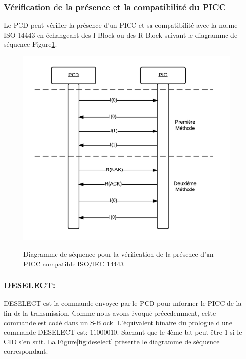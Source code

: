 \documentclass{themeensg}
\begin{document}
\subsubsection{Vérification de la présence et la compatibilité du PICC}
Le PCD peut vérifier la présence d'un PICC et sa compatibilité avec la norme ISO-14443 en échangeant des I-Block ou des R-Block suivant le diagramme de séquence Figure\ref{fig:presencecheck}.

\begin{figure}[h!]
\centering
\includegraphics[scale=0.9]{images/presencecheck.png}
\label{fig:presencecheck}
\caption{Diagramme de séquence pour la vérification de la présence d'un PICC compatible ISO/IEC 14443}
\end{figure}

\subsubsection{DESELECT:}
DESELECT est la commande envoyée par le PCD pour informer le PICC de la fin de la transmission. Comme nous avons évoqué précedemment, cette commande est codé dans un S-Block. L'équivalent binaire du prologue d'une commande DESELECT est: $11000010$. Sachant que le 4ème bit peut être 1 si le CID s'en suit. La Figure\ref{fig:deselect} présente le diagramme de séquence correspondant.
\end{document}
